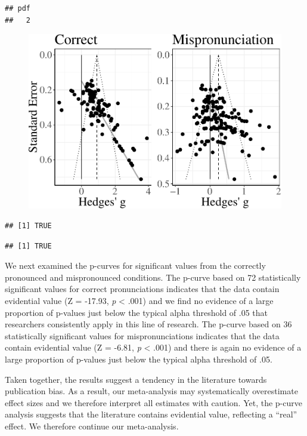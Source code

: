 \documentclass[man]{apa6}
\theoremstyle{definition}
\theoremstyle{definition}
\theoremstyle{definition}
\theoremstyle{remark}
\begin{document}
\begin{verbatim}
## pdf 
##   2
\end{verbatim}

\begin{figure}
\centering
\includegraphics{Paper_Analyses_files/figure-latex/FunnelCombo-1.pdf}
\caption{}
\end{figure}

\begin{verbatim}
## [1] TRUE
\end{verbatim}

\begin{verbatim}
## [1] TRUE
\end{verbatim}

We next examined the p-curves for significant values from the correctly
pronounced and mispronounced conditions. The p-curve based on 72
statistically significant values for correct pronunciations indicates
that the data contain evidential value (Z = -17.93, \emph{p} \textless{}
.001) and we find no evidence of a large proportion of p-values just
below the typical alpha threshold of .05 that researchers consistently
apply in this line of research. The p-curve based on 36 statistically
significant values for mispronunciations indicates that the data contain
evidential value (Z = -6.81, \emph{p} \textless{} .001) and there is
again no evidence of a large proportion of p-values just below the
typical alpha threshold of .05.

Taken together, the results suggest a tendency in the literature towards
publication bias. As a result, our meta-analysis may systematically
overestimate effect sizes and we therefore interpret all estimates with
caution. Yet, the p-curve analysis suggests that the literature contains
evidential value, reflecting a \enquote{real} effect. We therefore
continue our meta-analysis.
\end{document}

